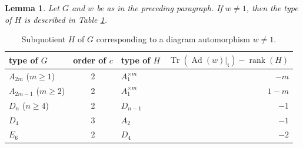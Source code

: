 \documentclass[JEP,XML,SOM,Unicode,NoFloatCountersInSection,published]{cedram}
\newtheorem{lem}[equation]{Lemma}
\theoremstyle{definition}
\newcommand{\mft}{\mathfrak{t}}
\DeclareMathOperator{\Tr}{Tr}
\DeclareMathOperator{\Ad}{Ad}
\DeclareMathOperator{\rank}{rank}
\begin{document}
\begin{lem} \label{fixed.system}
Let $G$ and $w$ be as in the preceding paragraph. If $w \ne 1$, then
the type of $H$ is described in
Table \ref{H.table}.
\end{lem}
\begin{table}[hbtp]
\caption{Subquotient $H$ of $G$ corresponding to a diagram automorphism $w \ne 1$.} \label{H.table}
{
\begin{tabular}{lclr} \toprule
type of $G$&order of $c$&type of $H$ & $\Tr(\Ad(w)\vert_{\mft})-\rank(H)$ \\ \midrule
$A_{2m}$ ($m \ge 1$)&2&$A_1^{\times m}$ & $-m$\\
$A_{2m-1}$ ($m \ge 2$)&2&$A_1^{\times m}$ & $1-m$\\
$D_n$ ($n \ge 4$)&2&$D_{n-1}$ & $-1$ \\
$D_4$&3&$A_2$ & $-1$ \\
$E_6$&2&$D_4$ & $-2$ \\ \bottomrule
\end{tabular}}
\end{table}
\end{document}
